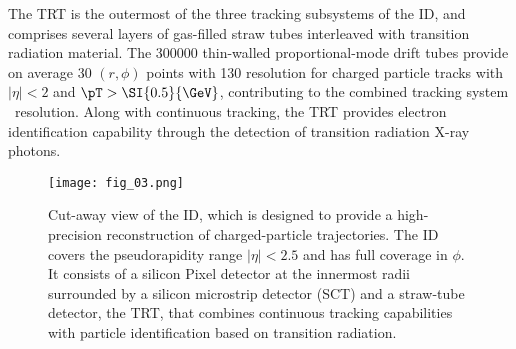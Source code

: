\documentclass[cernpreprint, atlasdraft=false, UKenglish,british,orcidlogo, texmf, orcidlogo]{atlasdoc}
\begin{document}
The \gls{TRT} is the outermost of the three tracking subsystems of the \gls{ID}, and comprises several layers of gas-filled straw tubes interleaved with transition radiation material. The \num{300000} thin-walled proportional-mode drift tubes provide on average \num{30} $(r,\phi)$ points with \SI{130}{\micron} resolution for charged particle tracks with $|\eta| < 2$ and $\pT > \SI{0.5}{\GeV}$, contributing to the combined tracking system \pT\ resolution. Along with continuous tracking, the \gls{TRT} provides electron identification capability through the detection of transition radiation X-ray photons.
 
\begin{figure}[t]
\centerline{\texttt{[image: fig\_03.png]}}
\caption{Cut-away view of the \ATLAS \gls{ID}, which is designed to provide a high-precision reconstruction of charged-particle trajectories. The \gls{ID} covers the pseudorapidity range $|\eta| < 2.5$ and has full coverage in $\phi$. It consists of a silicon \gls{Pixel} detector at the innermost radii surrounded by a silicon microstrip detector (\gls{SCT}) and a straw-tube detector, the \gls{TRT}, that combines continuous tracking capabilities with particle identification based on transition radiation.
\label{fig:Overview:ID}}
\end{figure}
 
\end{document}
